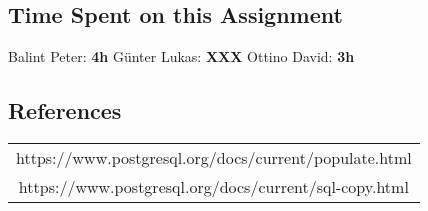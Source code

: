 \documentclass[11pt]{scrartcl}
\begin{document}
\subsection*{Time Spent on this Assignment}

Balint Peter: \textbf{4h}
Günter Lukas:  \textbf{XXX}
Ottino David: \textbf{3h}

\subsection*{References}

\begin{table}[H]
  \centering
  \begin{tabular}{c}
    \hline
    https://www.postgresql.org/docs/current/populate.html \tabularnewline
    https://www.postgresql.org/docs/current/sql-copy.html \tabularnewline
    \hline
  \end{tabular}
\end{table}
\end{document}
